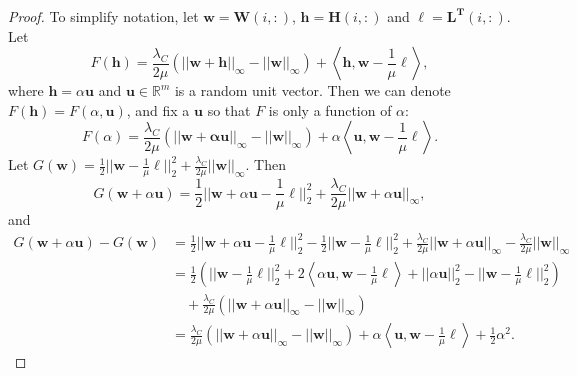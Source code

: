 \documentclass[10pt,a4paper]{amsart}
\begin{document}
\begin{proof}
\noindent To simplify notation, let $\mathbf{w} = \mathbf{W}(i,:)$, $\mathbf{h} = \mathbf{H}(i,:)$ and $\boldsymbol\ell = \mathbf{L^T}(i,:)$.  Let
\[
F(\mathbf{h}) = \frac{\lambda_C}{2\mu} (||\mathbf{w+h}||_\infty - ||\mathbf{w}||_\infty) + \left\langle \mathbf{h}, \mathbf{w} - \frac{1}{\mu}\boldsymbol  \ell \right\rangle, 
\]
where $\mathbf{h} = \alpha \mathbf{u}$ and $\mathbf{u} \in \mathbb{R}^{m}$ is a random unit vector.  Then we can denote $F(\mathbf{h}) = F(\alpha, \mathbf{u})$, and fix a $\mathbf{u}$ so that $F$ is only a function of $\alpha$: 
\[
F(\alpha) = \frac{\lambda_C}{2\mu} (||\mathbf{w+\alpha\mathbf{u}}||_\infty - ||\mathbf{w}||_\infty) + \alpha \left\langle \mathbf{u}, \mathbf{w} - \frac{1}{\mu}\boldsymbol \ell \right\rangle. 
\]
Let $G(\mathbf{w}) = \frac{1}{2} ||\mathbf{w} - \frac{1}{\mu} \boldsymbol \ell||^2_2 + \frac{\lambda_C}{2\mu}||\mathbf{w}||_{\infty}$. Then
\[
G(\mathbf{w} + \alpha \mathbf{u}) = \frac{1}{2}||\mathbf{w} + \alpha \mathbf{u} - \frac{1}{\mu} \boldsymbol \ell||^2_2 + \frac{\lambda_C}{2\mu}||\mathbf{w} + \alpha \mathbf{u}||_{\infty},
\]
and
\begin{equation*}
\begin{split}
G(\mathbf{w} + \alpha \mathbf{u}) - G(\mathbf{w}) & = \frac{1}{2}||\mathbf{w} + \alpha \mathbf{u} - \frac{1}{\mu} \boldsymbol \ell||^2_2 - \frac{1}{2}||\mathbf{w} - \frac{1}{\mu} \boldsymbol \ell||^2_2 + \frac{\lambda_C}{2\mu}||\mathbf{w} + \alpha \mathbf{u}||_{\infty} - \frac{\lambda_C}{2\mu}||\mathbf{w}||_{\infty} \\
& = \frac{1}{2} \left( ||\mathbf{w} - \frac{1}{\mu} \boldsymbol \ell||^2_2 + 2 \left\langle \alpha \mathbf{u}, \mathbf{w} - \frac{1}{\mu} \boldsymbol \ell \right\rangle + ||\alpha \mathbf{u}||^2_2 - ||\mathbf{w} - \frac{1}{\mu} \boldsymbol \ell||^2_2 \right) \\ 
& \quad + \frac{\lambda_C}{2\mu}(||\mathbf{w} + \alpha \mathbf{u}||_{\infty} - ||\mathbf{w}||_{\infty}) \\
& = \frac{\lambda_C}{2\mu}(||\mathbf{w} + \alpha \mathbf{u}||_{\infty} - ||\mathbf{w}||_{\infty}) + \alpha \left\langle \mathbf{u}, \mathbf{w} - \frac{1}{\mu} \boldsymbol \ell \right\rangle + \frac{1}{2}\alpha^2.
\end{split}
\end{equation*}


\end{proof}
\end{document}
